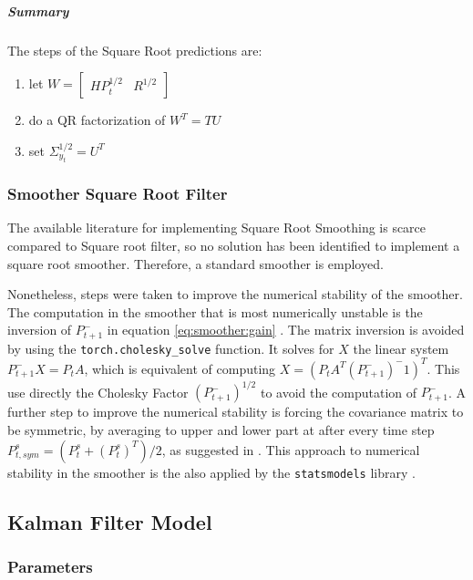 \documentclass{article}
\let\Oldsubsection\subsection
\renewcommand{\subsection}{\FloatBarrier\Oldsubsection}
\begin{document}
\subparagraph{Summary} The steps of the Square Root predictions are:

\begin{enumerate}
    \item let  $W = \begin{bmatrix}HP_t^{1/2} & R^{1/2}\end{bmatrix}$
    \item do a QR factorization of $W^T=TU$
    \item set $\Sigma_{y_t}^{1/2} = U^T$
\end{enumerate}

\subsubsection{Smoother Square Root Filter}

The available literature for implementing Square Root Smoothing is scarce compared to Square root filter, so no solution has been identified to implement a square root smoother. Therefore, a standard smoother is employed.

Nonetheless, steps were taken to improve the numerical stability of the smoother. The computation in the smoother that is most numerically unstable is the inversion of $P^-_{t+1}$ in equation \ref{eq:smoother:gain} \cite{mohinder_s_grewal_kalman_2001}. The matrix inversion is avoided by using the \verb|torch.cholesky_solve| function. It solves for $X$ the linear system $P^-_{t+1}X=P_tA$, which is equivalent of computing $X = (P_tA^T(P^-_{t+1})^-1)^T$. This use directly the Cholesky Factor $(P^-_{t+1})^{1/2}$ to avoid the computation of $P^-_{t+1}$. A further step to improve the numerical stability is forcing the covariance matrix to be symmetric, by averaging to upper and lower part at after every time step $P^s_{t, sym} = (P^s_t + (P^s_t)^T)/2$, as suggested in \cite{dan_simon_optimal_2006}.
This approach to numerical stability in the smoother is the also applied by the \texttt{statsmodels} library \cite{noauthor_statsmodelstsastatespacekalman_filterkalmanfilter_nodate}.

\subsection{Kalman Filter Model}

\subsubsection{Parameters}
\end{document}
